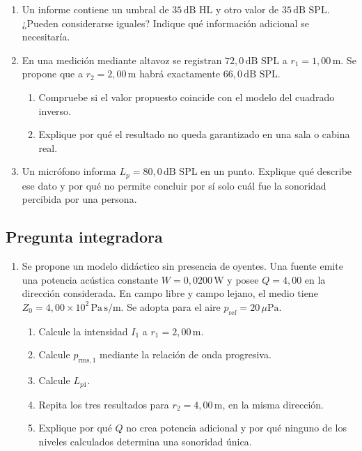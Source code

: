 \begin{enumerate}[label=\textbf{F\arabic*.},leftmargin=*]
    \item Un informe contiene un umbral de \(35\,\text{dB HL}\) y otro valor de
    \(35\,\text{dB SPL}\). ¿Pueden considerarse iguales? Indique qué
    información adicional se necesitaría.

    \item En una medición mediante altavoz se registran
    \(72{,}0\,\text{dB SPL}\) a \(r_1=1{,}00\,\text{m}\). Se propone que a
    \(r_2=2{,}00\,\text{m}\) habrá exactamente
    \(66{,}0\,\text{dB SPL}\).
    \begin{enumerate}[label=\alph*)]
        \item Compruebe si el valor propuesto coincide con el modelo del
        cuadrado inverso.
        \item Explique por qué el resultado no queda garantizado en una sala
        o cabina real.
    \end{enumerate}

    \item Un micrófono informa
    \(L_p=80{,}0\,\text{dB SPL}\) en un punto. Explique qué describe ese dato y
    por qué no permite concluir por sí solo cuál fue la sonoridad percibida por
    una persona.
\end{enumerate}

\newpage
\subsection*{Pregunta integradora}

\begin{enumerate}[label=\textbf{I\arabic*.},leftmargin=*]
    \item Se propone un modelo didáctico sin presencia de oyentes. Una fuente
    emite una potencia acústica constante
    \(W=0{,}0200\,\text{W}\) y posee
    \(Q=4{,}00\) en la dirección considerada. En campo libre y campo lejano,
    el medio tiene
    \(Z_0=4{,}00\times10^2\,\text{Pa}\,\text{s}/\text{m}\). Se adopta para el aire
    \(p_\mathrm{ref}=20\,\mu\text{Pa}\).
    \begin{enumerate}[label=\alph*)]
        \item Calcule la intensidad \(I_1\) a
        \(r_1=2{,}00\,\text{m}\).
        \item Calcule \(p_{\mathrm{rms},1}\) mediante la relación de onda
        progresiva.
        \item Calcule \(L_{p1}\).
        \item Repita los tres resultados para
        \(r_2=4{,}00\,\text{m}\), en la misma dirección.
        \item Explique por qué \(Q\) no crea potencia adicional y por qué
        ninguno de los niveles calculados determina una sonoridad única.
    \end{enumerate}
\end{enumerate}

